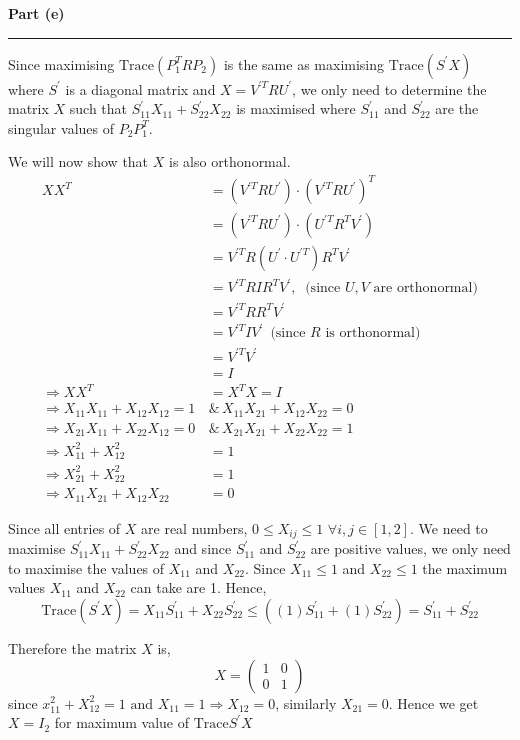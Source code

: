 \documentclass[a4paper,14pt]{article}
\newenvironment{solution}[2][]{%
    \begin{mdframed}[linecolor=blue!70!black, linewidth=2pt, roundcorner=10pt, backgroundcolor=yellow!10!white, skipabove=12pt, skipbelow=12pt]%
        \textbf{\large #2}
        \par\noindent\rule{\textwidth}{0.4pt}
}{
    \end{mdframed}
}
\begin{document}
\begin{solution}{Part (e)}
  Since maximising $\text{Trace}(P_{1}^{T}RP_{2})$ is the same as maximising $\text{Trace}(S^{'}X)$ where $S^{'}$ is a 
    diagonal matrix and $X = V^{'T} R U^{'}$, we only need to determine the matrix $X$ such that 
    $S^{'}_{11}X_{11} + S^{'}_{22}X_{22}$ is maximised where $S^{'}_{11}$ and $S^{'}_{22}$ are the singular values of 
    $P_{2}P_{1}^{T}$. 

    We will now show that $X$ is also orthonormal.
    \begin{align*}
      X X^{T} &= (V^{'T} R U^{'}) \cdot {(V^{'T} R U^{'})}^{T} \\
              &= (V^{'T} R U^{'}) \cdot (U^{'T} R^{T} V^{'}) \\
              &= V^{'T} R (U^{'} \cdot U^{'T}) R^{T} V^{'} \\
              &= V^{'T} R I R^{T} V^{'} ,\ \text{ (since $U,V$ are orthonormal)}\\
              &= V^{'T} RR^{T} V^{'} \\
              &= V^{'T} I V^{'} \, \text{ (since $R$ is orthonormal)}\\
              &= V^{'T} V^{'} \\
              &= I \\
      \Rightarrow X X^{T} &= X^{T} X = I \\
      \Rightarrow X_{11}X_{11} + X_{12}X_{12} = 1 \, &\text{\&} \, X_{11}X_{21} + X_{12}X_{22} = 0 \\
      \Rightarrow X_{21}X_{11} + X_{22}X_{12} = 0 \, &\text{\&} \, X_{21}X_{21} + X_{22}X_{22} = 1 \\
      \Rightarrow X_{11}^{2} + X_{12}^{2} &= 1  \\
      \Rightarrow X_{21}^{2} + X_{22}^{2} &= 1 \\
      \Rightarrow X_{11}X_{21} + X_{12}X_{22} &= 0
    \end{align*}

    Since all entries of $X$ are real numbers, $0 \leqslant X_{ij} \leqslant 1$ $\forall i,j \in [1,2]$. We need to maximise
    $S^{'}_{11}X_{11} + S^{'}_{22}X_{22}$ and since $S^{'}_{11}$ and $S^{'}_{22}$ are positive values, we only need to maximise
    the values of $X_{11}$ and $X_{22}$. Since $X_{11} \leqslant 1$ and $X_{22} \leqslant 1$ the maximum values $X_{11}$ and 
    $X_{22}$ can take are 1. Hence,
    \[\text{Trace}(S^{'}X) = X_{11}S^{'}_{11} + X_{22}S^{'}_{22} \leqslant ((1)S^{'}_{11} + (1)S^{'}_{22}) =  S^{'}_{11} + S^{'}_{22}\]
 
    Therefore the matrix $X$ is,
    \[ X = \begin{pmatrix}
      1 & 0 \\
      0 & 1
    \end{pmatrix}\]
    since $x_{11}^{2} + X_{12}^{2} = 1 \text{ and } X_{11} = 1 \Rightarrow X_{12} = 0$, similarly $X_{21} = 0$. Hence we get 
    $X = I_{2}$ for maximum value of $\text{Trace}S^{'}X$


\end{solution}
\end{document}
